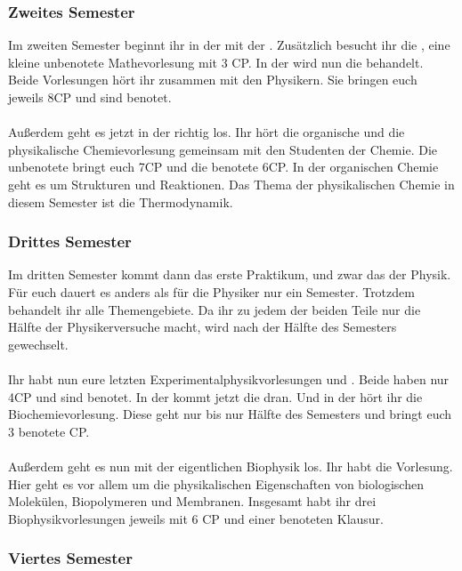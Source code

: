 \subsubsection{Zweites Semester}

Im zweiten Semester beginnt ihr in der  mit der .
Zusätzlich besucht ihr die , eine kleine unbenotete Mathevorlesung mit 3 CP.
In der  wird nun die  behandelt.
Beide Vorlesungen hört ihr zusammen mit den Physikern.
Sie bringen euch jeweils 8CP und sind benotet.\\ 
\bigskip\\
%
Außerdem geht es jetzt in der  richtig los.
Ihr hört die organische und die physikalische Chemievorlesung gemeinsam mit den Studenten der Chemie.
Die unbenotete  bringt euch 7CP und die benotete  6CP.
In der organischen Chemie geht es um Strukturen und Reaktionen. Das Thema der physikalischen Chemie in diesem Semester ist die Thermodynamik.

\subsubsection{Drittes Semester}

Im dritten Semester kommt dann das erste Praktikum, und zwar das  der Physik.
Für euch dauert es anders als für die Physiker nur ein Semester.
Trotzdem behandelt ihr alle Themengebiete.
Da ihr zu jedem der beiden Teile nur die Hälfte der Physikerversuche macht, wird nach der Hälfte des Semesters gewechselt.\\ 
\bigskip\\
%
Ihr habt nun eure letzten Experimentalphysikvorlesungen  und .
Beide haben nur 4CP und sind benotet.
In der  kommt jetzt die  dran.
Und in der  hört ihr die Biochemievorlesung.
Diese geht nur bis nur Hälfte des Semesters und bringt euch 3 benotete CP.\\ 
\bigskip\\
%
Außerdem geht es nun mit der eigentlichen Biophysik los.
Ihr habt die  Vorlesung.
Hier geht es vor allem um die physikalischen Eigenschaften von biologischen Molekülen, Biopolymeren und Membranen.
Insgesamt habt ihr drei Biophysikvorlesungen jeweils mit 6 CP und einer benoteten Klausur.

\subsubsection{Viertes Semester}

